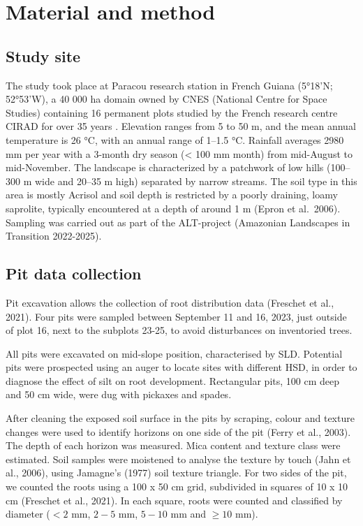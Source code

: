 \documentclass[fleqn,12pt]{latex/stylish_article} %
\begin{document}
\hypertarget{material-and-method}{%
\section{Material and method}\label{material-and-method}}

\hypertarget{study-site}{%
\subsection{Study site}\label{study-site}}

The study took place at Paracou research station in French Guiana (5°18'N; 52°53'W), a 40 000 ha domain owned by CNES (National Centre for Space Studies) containing 16 permanent plots studied by the French research centre CIRAD for over 35 years . Elevation ranges from 5 to 50 m, and the mean annual temperature is 26 °C, with an annual range of 1--1.5 °C. Rainfall averages 2980 mm per year with a 3-month dry season (\textless{} 100 mm month) from mid-August to mid-November. The landscape is characterized by a patchwork of low hills (100--300 m wide and 20--35 m high) separated by narrow streams. The soil type in this area is mostly Acrisol and soil depth is restricted by a poorly draining, loamy saprolite, typically encountered at a depth of around 1 m (Epron et al.~2006).
Sampling was carried out as part of the ALT-project (Amazonian Landscapes in Transition 2022-2025).

\hypertarget{pit-data-collection}{%
\subsection{Pit data collection}\label{pit-data-collection}}

Pit excavation allows the collection of root distribution data (Freschet et al., 2021). Four pits were sampled between September 11 and 16, 2023, just outside of plot 16, next to the subplots 23-25, to avoid disturbances on inventoried trees.

All pits were excavated on mid-slope position, characterised by SLD. Potential pits were prospected using an auger to locate sites with different HSD, in order to diagnose the effect of silt on root development. Rectangular pits, 100 cm deep and 50 cm wide, were dug with pickaxes and spades.

After cleaning the exposed soil surface in the pits by scraping, colour and texture changes were used to identify horizons on one side of the pit (Ferry et al., 2003). The depth of each horizon was measured. Mica content and texture class were estimated. Soil samples were moistened to analyse the texture by touch (Jahn et al., 2006), using Jamagne's (1977) soil texture triangle. For two sides of the pit, we counted the roots using a 100 x 50 cm grid, subdivided in squares of 10 x 10 cm (Freschet et al., 2021). In each square, roots were counted and classified by diameter (\(< 2\) mm, \(2-5\) mm, \(5-10\) mm and \(≥ 10\) mm).
\end{document}

